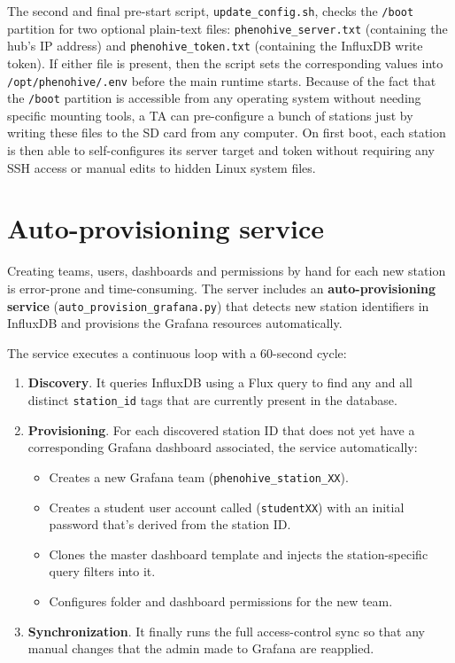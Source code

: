 The second and final pre-start script, \texttt{update\_config.sh}, checks the \texttt{/boot} partition for two optional plain-text files: \texttt{phenohive\_server.txt} (containing the hub's IP address) and \texttt{phenohive\_token.txt} (containing the InfluxDB write token). If either file is present, then the script sets the corresponding values into \texttt{/opt/phenohive/.env} before the main runtime starts. Because of the fact that the \texttt{/boot} partition is accessible from any operating system without needing specific mounting tools, a TA can pre-configure a bunch of stations just by writing these files to the SD card from any computer. On first boot, each station is then able to self-configures its server target and token without requiring any SSH access or manual edits to hidden Linux system files.

\section{Auto-provisioning service}

Creating teams, users, dashboards and permissions by hand for each new station is error-prone and time-consuming. The server includes an \textbf{auto-provisioning service} (\texttt{auto\_provision\_grafana.py}) that detects new station identifiers in InfluxDB and provisions the Grafana resources automatically.

The service executes a continuous loop with a 60-second cycle:
\begin{enumerate}
    \item \textbf{Discovery}. It queries InfluxDB using a Flux query to find any and all distinct \texttt{station\_id} tags that are currently present in the database.
    \item \textbf{Provisioning}. For each discovered station ID that does not yet have a corresponding Grafana dashboard associated, the service automatically:
    \begin{itemize}
        \item Creates a new Grafana team (\texttt{phenohive\_station\_XX}).
        \item Creates a student user account called (\texttt{studentXX}) with an initial password that's derived from the station ID.
        \item Clones the master dashboard template and injects the station-specific query filters into it.
        \item Configures folder and dashboard permissions for the new team.
    \end{itemize}
    \item \textbf{Synchronization}. It finally runs the full access-control sync so that any manual changes that the admin made to Grafana are reapplied.
\end{enumerate}

